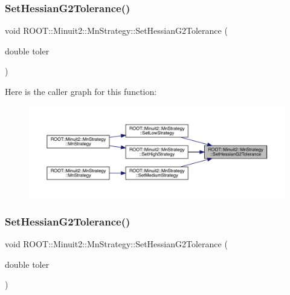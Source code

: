 \mbox{\label{classROOT_1_1Minuit2_1_1MnStrategy_aed3f2b229af4c5a4091507830f4275e0}} 
\subsubsection{\texorpdfstring{SetHessianG2Tolerance()}{SetHessianG2Tolerance()}\hspace{0.1cm}{\footnotesize\ttfamily [1/2]}}
{\footnotesize\ttfamily void R\+O\+O\+T\+::\+Minuit2\+::\+Mn\+Strategy\+::\+Set\+Hessian\+G2\+Tolerance (\begin{DoxyParamCaption}\item[{double}]{toler }\end{DoxyParamCaption})\hspace{0.3cm}{\ttfamily [inline]}}

Here is the caller graph for this function\+:\nopagebreak
\begin{figure}[H]
\begin{center}
\leavevmode
\includegraphics[width=350pt]{da/de4/classROOT_1_1Minuit2_1_1MnStrategy_aed3f2b229af4c5a4091507830f4275e0_icgraph}
\end{center}
\end{figure}
\mbox{\label{classROOT_1_1Minuit2_1_1MnStrategy_aed3f2b229af4c5a4091507830f4275e0}} 
\subsubsection{\texorpdfstring{SetHessianG2Tolerance()}{SetHessianG2Tolerance()}\hspace{0.1cm}{\footnotesize\ttfamily [2/2]}}
{\footnotesize\ttfamily void R\+O\+O\+T\+::\+Minuit2\+::\+Mn\+Strategy\+::\+Set\+Hessian\+G2\+Tolerance (\begin{DoxyParamCaption}\item[{double}]{toler }\end{DoxyParamCaption})\hspace{0.3cm}{\ttfamily [inline]}}

